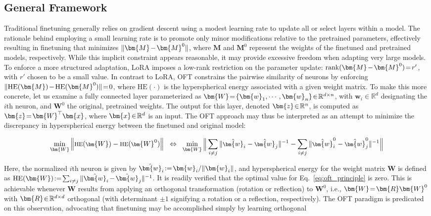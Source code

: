 \subsection{General Framework}

Traditional finetuning generally relies on gradient descent using a modest learning rate to update all or select layers within a model. The rationale behind employing a small learning rate is to promote only minor modifications relative to the pretrained parameters, effectively resulting in finetuning that minimizes $\thickmuskip=2mu \medmuskip=2mu \| \bm{M} - \bm{M}^0\|$, where $\bm{M}$ and $\bm{M}^0$ represent the weights of the finetuned and pretrained models, respectively. While this implicit constraint appears reasonable, it may provide excessive freedom when adapting very large models. To enforce a more structured adaptation, LoRA imposes a low-rank restriction on the parameter update: $\thickmuskip=2mu \medmuskip=2mu \text{rank}(\bm{M} - \bm{M}^0)=r'$, with $r'$ chosen to be a small value. In contrast to LoRA, OFT constrains the pairwise similarity of neurons by enforcing $\thickmuskip=2mu \medmuskip=2mu \| \text{HE}(\bm{M})-\text{HE}(\bm{M}^0) \|=0$, where $\text{HE}(\cdot)$ is the hyperspherical energy associated with a given weight matrix. To make this more concrete, let us examine a fully connected layer parameterized as $\thickmuskip=2mu \medmuskip=2mu \bm{W}=\{\bm{w}_1,\cdots,\bm{w}_n\}\in\mathbb{R}^{d\times n}$, with $\bm{w}_i\in\mathbb{R}^{d}$ designating the $i$th neuron, and $\bm{W}^0$ the original, pretrained weights. The output for this layer, denoted $\thickmuskip=2mu \medmuskip=2mu \bm{z}\in\mathbb{R}^n$, is computed as $\thickmuskip=2mu \medmuskip=2mu \bm{z}=\bm{W}^\top\bm{x}$, where $\thickmuskip=2mu \medmuskip=2mu \bm{x}\in\mathbb{R}^d$ is an input. The OFT approach may thus be interpreted as an attempt to minimize the discrepancy in hyperspherical energy between the finetuned and original model:

\begin{equation}\label{eq:oft_principle}
\footnotesize
\min_{\bm{W}} \left\| \text{HE}(\bm{W})-\text{HE}(\bm{W}^0)\right\|~~\Leftrightarrow~~\min_{\bm{W}} \bigg{\|} \sum_{i\neq j} \|\hat{\bm{w}}_i-\hat{\bm{w}}_j\|^{-1}-\sum_{i\neq j} \|\hat{\bm{w}}^0_i-\hat{\bm{w}}^0_j\|^{-1}\bigg{\|}
\end{equation}

Here, the normalized $i$th neuron is given by $\thickmuskip=2mu \medmuskip=2mu \hat{\bm{w}}_i:=\bm{w}_i/\|\bm{w}_i\|$, and hyperspherical energy for the weight matrix $\bm{W}$ is defined as $\thickmuskip=2mu \medmuskip=2mu \text{HE}(\bm{W}):= \sum_{i\neq j} \|\hat{\bm{w}}_i-\hat{\bm{w}}_j\|^{-1}$. It is readily verified that the optimal value for Eq.~\eqref{eq:oft_principle} is zero. This is achievable whenever $\bm{W}$ results from applying an orthogonal transformation (rotation or reflection) to $\bm{W}^0$, i.e., $\thickmuskip=2mu \medmuskip=2mu \bm{W}=\bm{R}\bm{W}^0$ with $\thickmuskip=2mu \medmuskip=2mu \bm{R}\in\mathbb{R}^{d\times d}$ orthogonal (with determinant $\pm1$ signifying a rotation or a reflection, respectively). The OFT paradigm is predicated on this observation, advocating that finetuning may be accomplished simply by learning orthogonal

